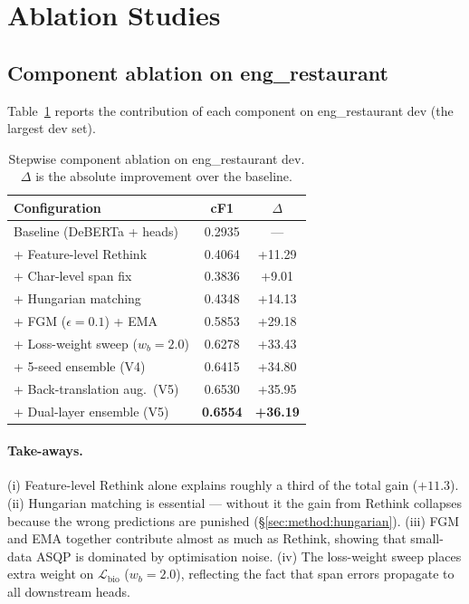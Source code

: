 \documentclass[11pt]{article}
\begin{document}
\section{Ablation Studies}
\label{sec:ablation}

\subsection{Component ablation on eng\_restaurant}

Table~\ref{tab:abl-eng} reports the contribution of each component on
eng\_restaurant dev (the largest dev set).

\begin{table}[h]
\centering\small
\begin{tabular}{lcc}
\toprule
Configuration & cF1 & $\Delta$ \\
\midrule
Baseline (DeBERTa + heads) & 0.2935 & — \\
+ Feature-level Rethink     & 0.4064 & +11.29 \\
+ Char-level span fix       & 0.3836 & +9.01 \\
+ Hungarian matching        & 0.4348 & +14.13 \\
+ FGM ($\epsilon{=}0.1$) + EMA & 0.5853 & +29.18 \\
+ Loss-weight sweep ($w_b{=}2.0$) & 0.6278 & +33.43 \\
+ 5-seed ensemble (V4)      & 0.6415 & +34.80 \\
+ Back-translation aug.\ (V5) & 0.6530 & +35.95 \\
+ Dual-layer ensemble (V5)  & \textbf{0.6554} & \textbf{+36.19} \\
\bottomrule
\end{tabular}
\caption{Stepwise component ablation on eng\_restaurant dev.
$\Delta$ is the absolute improvement over the baseline.}
\label{tab:abl-eng}
\end{table}

\paragraph{Take-aways.}
(i) Feature-level Rethink alone explains roughly a third of the total
gain ($+11.3$).
(ii) Hungarian matching is essential — without it the gain from
Rethink collapses because the wrong predictions are punished
(\S\ref{sec:method:hungarian}).
(iii) FGM and EMA together contribute almost as much as Rethink,
showing that small-data ASQP is dominated by optimisation noise.
(iv) The loss-weight sweep places extra weight on
$\mathcal{L}_\text{bio}$ ($w_b{=}2.0$), reflecting the fact that span
errors propagate to all downstream heads.
\end{document}

